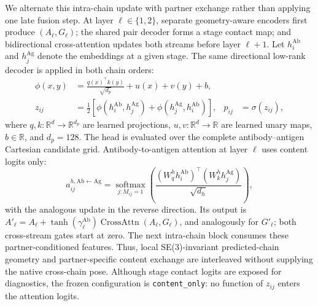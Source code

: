 \documentclass[10pt]{article}
\begin{document}
We alternate this intra-chain update with partner exchange rather than applying
one late fusion step. At layer $\ell\in\{1,2\}$, separate geometry-aware encoders
first produce $(A_\ell,G_\ell)$; the shared pair decoder forms a stage contact
map; and bidirectional cross-attention updates both streams before layer
$\ell+1$. Let $h_i^{\mathrm{Ab}}$ and $h_j^{\mathrm{Ag}}$ denote the embeddings
at a given stage. The same directional low-rank decoder is applied in both chain
orders:
\begin{equation}
 \begin{aligned}
 \phi(x,y)&=\frac{q(x)^\top k(y)}{\sqrt{d_p}}+u(x)+v(y)+b,\\
 z_{ij}&=\tfrac12\!\left[
 \phi(h_i^{\mathrm{Ab}},h_j^{\mathrm{Ag}})+
 \phi(h_j^{\mathrm{Ag}},h_i^{\mathrm{Ab}})\right],
 &p_{ij}&=\sigma(z_{ij}),
 \end{aligned}
 \label{eq:contact}
\end{equation}
where $q,k:\mathbb{R}^{d}\rightarrow\mathbb{R}^{d_p}$ are learned projections,
$u,v:\mathbb{R}^{d}\rightarrow\mathbb{R}$ are learned unary maps,
$b\in\mathbb{R}$, and $d_p=128$. The head is evaluated over the complete
antibody--antigen Cartesian candidate grid. Antibody-to-antigen attention at
layer $\ell$ uses
content logits only:
\begin{equation}
 a^{h,\mathrm{Ab}\leftarrow\mathrm{Ag}}_{ij}
 =\operatorname*{softmax}_{j:M_{ij}=1}\!\left(
 \frac{(W_q^h h_i^{\mathrm{Ab}})^\top(W_k^h h_j^{\mathrm{Ag}})}
 {\sqrt{d_h}}\right),
 \label{eq:attention}
\end{equation}
with the analogous update in the reverse direction. Its output is
$A'_{\ell}=A_{\ell}+\tanh(\gamma_{\ell}^{\mathrm{Ab}})
\operatorname{CrossAttn}(A_{\ell},G_{\ell})$, and analogously for $G'_{\ell}$;
both cross-stream gates start at zero. The next intra-chain block consumes these
partner-conditioned features. Thus, local SE(3)-invariant predicted-chain geometry
and partner-specific content exchange are interleaved without supplying the
native cross-chain pose. Although stage contact logits are exposed for
diagnostics, the frozen configuration is
\texttt{content\_only}: no function of $z_{ij}$ enters the attention logits.
\end{document}
